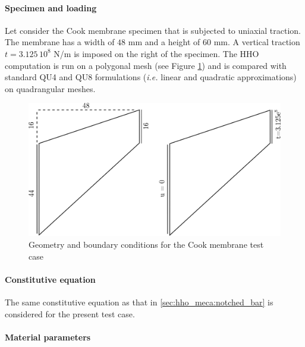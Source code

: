 \paragraph{Specimen and loading}

Let consider the Cook membrane specimen that is subjected to uniaxial
traction. The membrane has a width of $48$ mm and a height of $60$ mm.
A vertical traction $t = 3.125 \, 10^{8}$ N/m is imposed on the right of the specimen.
The HHO computation is run on a polygonal mesh (see Figure \ref{fig_cook}) and
is compared with standard QU4 and QU8 formulations (\textit{i.e.} linear
and quadratic approximations) on quadrangular meshes.

\begin{figure}[H]
    \centering
    \includegraphics[width=12.cm]{../chapter_002_hho_mechanics/drawings/cook_mesh.png}
    \caption{Geometry and boundary conditions for the Cook membrane test case}
    \label{fig_cook}
\end{figure}

\paragraph{Constitutive equation}

The same constitutive equation as that in \ref{sec:hho_meca:notched_bar} is
considered for the present test case.

\paragraph{Material parameters}

